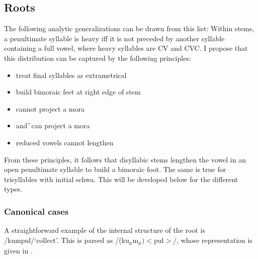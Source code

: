 \subsection{Roots}\label{sec:phon:analysis:Roots}

The following analytic generalizations can be drawn from this list: Within stems, a penultimate syllable is heavy iff it is not preceded by another syllable containing a full vowel, where heavy syllables are CV\textipa{:} and CVC. I propose that this distribution can be captured by the following principles:

\begin{itemize}
 \item treat final syllables as extrametrical 
 \item build bimoraic feet at right edge of stem
 \item \E{} cannot project a mora \citep{Kager1989}
 \item \I{} and \U{} can project a mora
 \item reduced vowels  cannot lengthen
\end{itemize}

From these principles, it follows that disyllabic stems lengthen the vowel in an open penultimate syllable to build a bimoraic foot. The same is true for trisyllables with initial schwa. This will be developed below for the different types.

\subsubsection{Canonical cases}\label{sec:phon:Canonicalcasesroots}

A straightforward example of the internal structure of the root is /kumpul/`collect'. This is parsed as /(ku$_{\mu}$m$_{\mu})<$pul$>$/, whose representation is given in .

